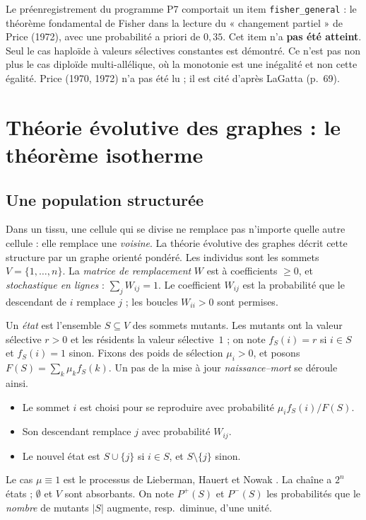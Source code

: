 \begin{warnbox}
Le préenregistrement du programme P7 comportait un item \texttt{fisher\_general} : le théorème fondamental de
Fisher dans la lecture du « changement partiel » de Price (1972), avec une probabilité a priori de $0{,}35$. Cet
item n'a \textbf{pas été atteint}. Seul le cas haploïde à valeurs sélectives constantes est démontré. Ce n'est
pas non plus le cas diploïde multi-allélique, où la monotonie est une inégalité et non cette égalité. Price (1970,
1972) n'a pas été lu ; il est cité d'après LaGatta \cite{ch4:LaG} (p.~69).
\end{warnbox}

\section{Théorie évolutive des graphes : le théorème isotherme}\label{ch4:sec:graphes}

\subsection{Une population structurée}
Dans un tissu, une cellule qui se divise ne remplace pas n'importe quelle autre cellule : elle remplace une
\emph{voisine}. La théorie évolutive des graphes décrit cette structure par un graphe orienté pondéré. Les
individus sont les sommets $V=\{1,\dots,n\}$. La \emph{matrice de remplacement} $W$ est à coefficients $\ge0$, et
\emph{stochastique en lignes} : $\sum_jW_{ij}=1$. Le coefficient $W_{ij}$ est la probabilité que le descendant de
$i$ remplace $j$ ; les boucles $W_{ii}>0$ sont permises.

Un \emph{état} est l'ensemble $S\subseteq V$ des sommets mutants. Les mutants ont la valeur sélective $r>0$ et les
résidents la valeur sélective~$1$ ; on note $f_S(i)=r$ si $i\in S$ et $f_S(i)=1$ sinon. Fixons des poids de
sélection $\mu_i>0$, et posons $F(S)=\sum_k\mu_kf_S(k)$. Un pas de la mise à jour \emph{naissance--mort} se
déroule ainsi.
\begin{itemize}[itemsep=1pt]
\item Le sommet $i$ est choisi pour se reproduire avec probabilité $\mu_if_S(i)/F(S)$.
\item Son descendant remplace $j$ avec probabilité $W_{ij}$.
\item Le nouvel état est $S\cup\{j\}$ si $i\in S$, et $S\setminus\{j\}$ sinon.
\end{itemize}
Le cas $\mu\equiv1$ est le processus de Lieberman, Hauert et Nowak \cite{ch4:LHN}. La chaîne a $2^n$ états ; $\emptyset$
et $V$ sont absorbants. On note $P^{+}(S)$ et $P^{-}(S)$ les probabilités que le \emph{nombre} de mutants $|S|$
augmente, resp.\ diminue, d'une unité.

